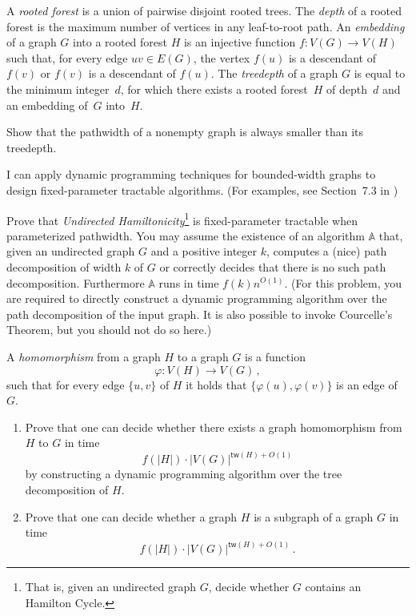\documentclass{uebung_cs}
\begin{document}
\begin{exercise}[Treedepth][\hard]
  A \emph{rooted forest} is a union of pairwise disjoint rooted trees. The \emph{depth} of a rooted forest is the maximum number of vertices in any leaf-to-root path. An \emph{embedding} of a graph $G$ into a rooted forest $H$ is an injective function $f \colon V (G) \rightarrow V(H)$ such that, for every edge $uv \in E(G)$, the vertex $f(u)$ is a descendant of $f(v)$ or $f(v)$ is a descendant of $f(u)$. The \emph{treedepth} of a graph $G$ is equal to the minimum integer~$d$, for which there exists a rooted forest~$H$ of depth~$d$ and an embedding of~$G$ into~$H$.

  Show that the pathwidth of a nonempty graph is always smaller than its treedepth.
\end{exercise}

\newpage
\begin{skill}
  I can apply dynamic programming techniques for bounded-width graphs to design fixed-parameter tractable algorithms. \normalfont (For examples, see Section~7.3 in \cygan{})
\end{skill}

\begin{exercise}
  Prove that \emph{Undirected Hamiltonicity}\footnote{That is, given an undirected graph $G$, decide whether $G$ contains an Hamilton Cycle.} is fixed-parameter tractable when parameterized pathwidth. You may assume the existence of an algorithm $\mathbb{A}$ that, given an undirected graph $G$ and a positive integer $k$, computes a (nice) path decomposition of width $k$ of $G$ or correctly decides that there is no such path decomposition. Furthermore $\mathbb{A}$ runs in time $f(k) n^{O(1)}$. (For this problem, you are required to directly construct a dynamic programming algorithm over the path decomposition of the input graph. It is also possible to invoke Courcelle's Theorem, but you should not do so here.)
\end{exercise}

\begin{exercise}%
  A \emph{homomorphism} from a graph $H$ to a graph $G$ is a function \[\varphi:V(H)\rightarrow V(G) \,, \] such that for every edge $\{u,v\}$ of $H$ it holds that $\{\varphi(u),\varphi(v)\}$ is an edge of $G$.
  \begin{enumerate}
    \item Prove that one can decide whether there exists a graph homomorphism from $H$ to $G$ in time
          \[f(|H|)\cdot |V(G)|^{\mathsf{tw}(H)+O(1)} \]
          by constructing a dynamic programming algorithm over the tree decomposition of $H$.
    \item Prove that one can decide whether a graph $H$ is a subgraph of a graph $G$ in time
          \[f(|H|)\cdot |V(G)|^{\mathsf{tw}(H)+O(1)} \,.\]
  \end{enumerate}
\end{exercise}
\end{document}
